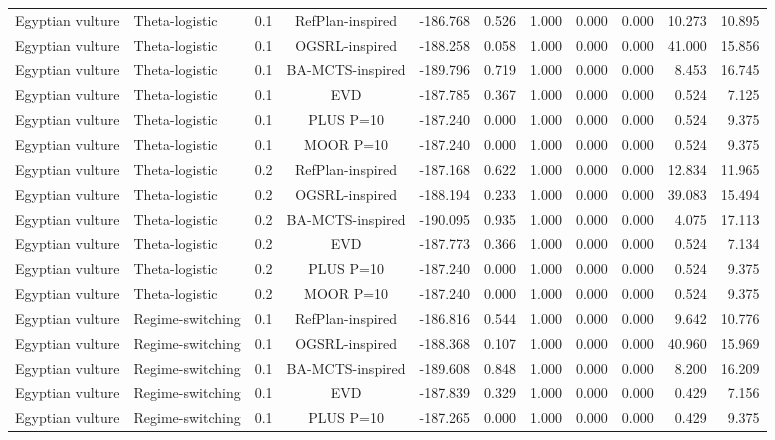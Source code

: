 \documentclass[10pt]{article}
\begin{document}
\begin{landscape}
\begin{center}
\begin{longtable}{@{}lllclrrrrrr@{}}
Egyptian vulture & Theta-logistic & 0.1 & RefPlan-inspired & -186.768 & 0.526 & 1.000 & 0.000 & 0.000 & 10.273 & 10.895 \\
Egyptian vulture & Theta-logistic & 0.1 & OGSRL-inspired & -188.258 & 0.058 & 1.000 & 0.000 & 0.000 & 41.000 & 15.856 \\
Egyptian vulture & Theta-logistic & 0.1 & BA-MCTS-inspired & -189.796 & 0.719 & 1.000 & 0.000 & 0.000 & 8.453 & 16.745 \\
Egyptian vulture & Theta-logistic & 0.1 & EVD & -187.785 & 0.367 & 1.000 & 0.000 & 0.000 & 0.524 & 7.125 \\
Egyptian vulture & Theta-logistic & 0.1 & PLUS P=10 & -187.240 & 0.000 & 1.000 & 0.000 & 0.000 & 0.524 & 9.375 \\
Egyptian vulture & Theta-logistic & 0.1 & MOOR P=10 & -187.240 & 0.000 & 1.000 & 0.000 & 0.000 & 0.524 & 9.375 \\
Egyptian vulture & Theta-logistic & 0.2 & RefPlan-inspired & -187.168 & 0.622 & 1.000 & 0.000 & 0.000 & 12.834 & 11.965 \\
Egyptian vulture & Theta-logistic & 0.2 & OGSRL-inspired & -188.194 & 0.233 & 1.000 & 0.000 & 0.000 & 39.083 & 15.494 \\
Egyptian vulture & Theta-logistic & 0.2 & BA-MCTS-inspired & -190.095 & 0.935 & 1.000 & 0.000 & 0.000 & 4.075 & 17.113 \\
Egyptian vulture & Theta-logistic & 0.2 & EVD & -187.773 & 0.366 & 1.000 & 0.000 & 0.000 & 0.524 & 7.134 \\
Egyptian vulture & Theta-logistic & 0.2 & PLUS P=10 & -187.240 & 0.000 & 1.000 & 0.000 & 0.000 & 0.524 & 9.375 \\
Egyptian vulture & Theta-logistic & 0.2 & MOOR P=10 & -187.240 & 0.000 & 1.000 & 0.000 & 0.000 & 0.524 & 9.375 \\
Egyptian vulture & Regime-switching & 0.1 & RefPlan-inspired & -186.816 & 0.544 & 1.000 & 0.000 & 0.000 & 9.642 & 10.776 \\
Egyptian vulture & Regime-switching & 0.1 & OGSRL-inspired & -188.368 & 0.107 & 1.000 & 0.000 & 0.000 & 40.960 & 15.969 \\
Egyptian vulture & Regime-switching & 0.1 & BA-MCTS-inspired & -189.608 & 0.848 & 1.000 & 0.000 & 0.000 & 8.200 & 16.209 \\
Egyptian vulture & Regime-switching & 0.1 & EVD & -187.839 & 0.329 & 1.000 & 0.000 & 0.000 & 0.429 & 7.156 \\
Egyptian vulture & Regime-switching & 0.1 & PLUS P=10 & -187.265 & 0.000 & 1.000 & 0.000 & 0.000 & 0.429 & 9.375 \\

\end{longtable}
\end{center}
\end{landscape}
\end{document}
